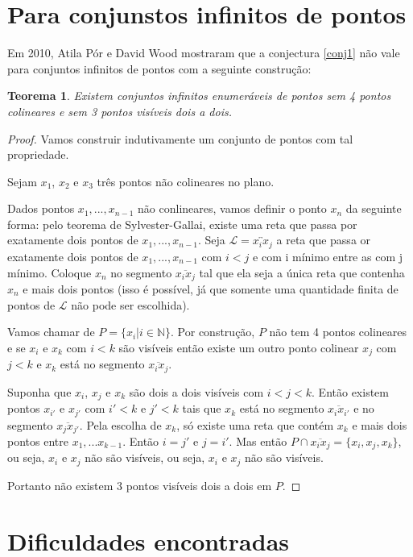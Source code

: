 \documentclass[a4paper]{book}
\newtheorem{teorema}{Teorema}[section]
\begin{document}
\section{Para conjunstos infinitos de pontos}
Em 2010\cite{infinity}, Atila Pór e David Wood mostraram que a conjectura \ref{conj1} não vale para conjuntos infinitos de pontos com a seguinte construção:

\begin{teorema}
    Existem conjuntos infinitos enumeráveis de pontos sem 4 pontos colineares e sem 3 pontos visíveis dois a dois.
\end{teorema}
\begin{proof}
    Vamos construir indutivamente um conjunto de pontos com tal propriedade.

    Sejam $x_1$, $x_2$ e $x_3$ três pontos não colineares no plano.

    Dados pontos $x_1,...,x_{n-1}$ não conlineares, vamos definir o ponto $x_n$ da seguinte forma: pelo teorema de Sylvester-Gallai, existe uma reta que passa por exatamente dois pontos de $x_1,...,x_{n-1}$. Seja $\mathcal L=\overleftrightarrow{x_ix_j}$ a reta que passa or exatamente dois pontos de $x_1,...,x_{n-1}$ com $i<j$ e com i mínimo entre as com j mínimo. Coloque $x_n$ no segmento $\overline{x_ix_j}$ tal que ela seja a única reta que contenha $x_n$ e mais dois pontos (isso é possível, já que somente uma quantidade finita de pontos de $\mathcal L$ não pode ser escolhida).

    Vamos chamar de $P = \{x_i|i\in \mathbb N\}$. Por construção, $P$ não tem 4 pontos colineares e se $x_i$ e $x_k$ com $i<k$ são visíveis então existe um outro ponto colinear $x_j$ com $j<k$ e $x_k$ está no segmento $\overline{x_ix_j}$.

    Suponha que $x_i$, $x_j$ e $x_k$ são dois a dois visíveis com $i<j<k$. Então existem pontos $x_{i'}$ e $x_{j'}$ com $i'<k$ e $j'<k$ tais que $x_k$ está no segmento $\overline{x_ix_{i'}}$ e no segmento $\overline{x_jx_{j'}}$. Pela escolha de $x_k$, só existe uma reta que contém $x_k$ e mais dois pontos entre $x_1,...x_{k-1}$. Então $i=j'$ e $j=i'$. Mas então $P\cap\overline{x_ix_j}=\{x_i,x_j,x_k\}$, ou seja, $x_i$ e $x_j$ não são visíveis, ou seja, $x_i$ e $x_j$ não são visíveis.

    Portanto não existem 3 pontos visíveis dois a dois em $P$.

\end{proof}

\section{Dificuldades encontradas}
\end{document}
